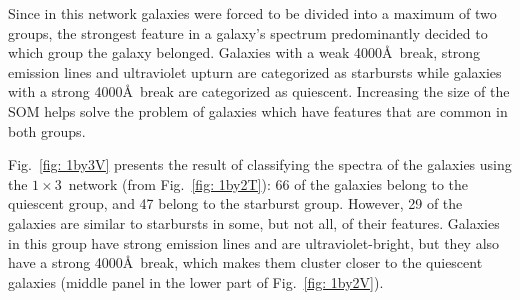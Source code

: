             Since in this network galaxies were forced to be divided into a maximum of two groups, the strongest feature in a galaxy's spectrum predominantly decided to which group the galaxy belonged.
            Galaxies with a weak 4000\AA~break, strong emission lines and ultraviolet upturn are categorized as starbursts while galaxies with a strong 4000\AA~break are categorized as quiescent.
            Increasing the size of the SOM helps solve the problem of galaxies which have features that are common in both groups.
            
            Fig.~\ref{fig: 1by3V} presents the result of classifying the spectra of the galaxies using the $1\times3$~network (from Fig.~\ref{fig: 1by2T}): 66 of the galaxies belong to the quiescent group, and 47 belong to the starburst group. 
            However, 29 of the galaxies are similar to starbursts in some, but not all, of their features. 
            Galaxies in this group have strong emission lines and are ultraviolet-bright, but they also have a strong 4000\AA~break, which makes them cluster closer to the quiescent galaxies (middle panel in the lower part of Fig.~\ref{fig: 1by2V}).

